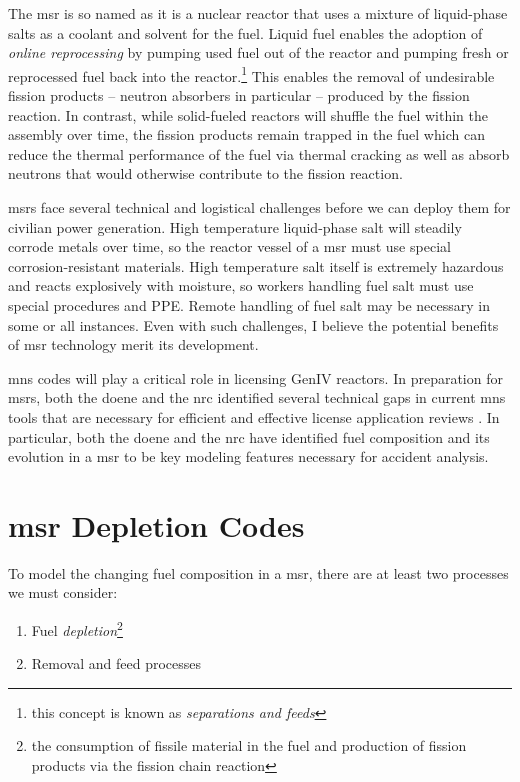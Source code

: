 The \Gls{msr} is so named as it is a nuclear reactor that uses a mixture of
liquid-phase salts as a coolant and solvent for the fuel. Liquid
fuel enables the adoption of {\it online reprocessing} by pumping used fuel out of
the reactor and pumping fresh or reprocessed fuel back into the
reactor.\footnote{this concept is known as {\it separations and feeds}} This
enables the removal of undesirable fission products -- neutron absorbers in
particular -- produced by the fission reaction. In contrast, while solid-fueled
reactors will shuffle the fuel within the assembly over time, the fission
products remain trapped in the fuel which can reduce the thermal performance of
the fuel via thermal cracking as well as absorb neutrons that would otherwise
contribute to the fission reaction. 

\Gls{msr}s face several technical and logistical challenges before we can
deploy them for civilian power generation. High temperature liquid-phase salt will
steadily corrode metals over time, so the reactor vessel of a \Gls{msr} must
use special corrosion-resistant materials. High temperature salt itself is
extremely hazardous and reacts explosively with moisture, so workers handling
fuel salt must use special procedures and PPE. Remote handling of fuel salt may
be necessary in some or all instances. Even with such challenges, I believe the
potential benefits of \Gls{msr} technology merit its development.

\Gls{mns} codes will play a critical role in licensing GenIV reactors. In
preparation for \Gls{msr}s, both the \Gls{doene} and the \Gls{nrc}
identified several technical gaps in current \Gls{mns} tools that are necessary
for efficient and effective license application reviews
\cite{betzler_modeling_2019} \cite{usnrc_nonlwr_2020-1}. In particular, both the
\Gls{doene} and the \Gls{nrc} have identified fuel composition and its
evolution in a \Gls{msr} to be key modeling features necessary for accident
analysis. 

\section{\Gls{msr} Depletion Codes}%
\label{sec:msr_codes}

To model the changing fuel composition in a \Gls{msr}, there are at least two
processes we must consider:
\begin{enumerate}
    \item Fuel {\it depletion}\footnote{the consumption of fissile material in the fuel and production of fission products via the fission chain reaction}
    \item Removal and feed processes
\end{enumerate}

